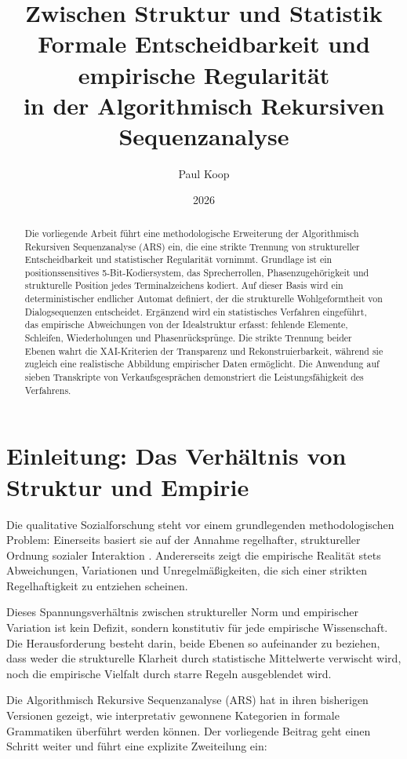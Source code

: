 \documentclass[
  12pt,
  a4paper,
  oneside,
  titlepage
]{article}
\title{\Huge\textbf{Zwischen Struktur und Statistik} \\
       \LARGE Formale Entscheidbarkeit und empirische Regularität \\
       \LARGE in der Algorithmisch Rekursiven Sequenzanalyse}
\author{
  \large
  \begin{tabular}{c}
    Paul Koop
  \end{tabular}
}
\date{\large 2026}
\begin{document}
\maketitle

\begin{abstract}
Die vorliegende Arbeit führt eine methodologische Erweiterung der Algorithmisch 
Rekursiven Sequenzanalyse (ARS) ein, die eine strikte Trennung von struktureller 
Entscheidbarkeit und statistischer Regularität vornimmt. Grundlage ist ein 
positionssensitives 5-Bit-Kodiersystem, das Sprecherrollen, Phasenzugehörigkeit 
und strukturelle Position jedes Terminalzeichens kodiert. Auf dieser Basis wird 
ein deterministischer endlicher Automat definiert, der die strukturelle 
Wohlgeformtheit von Dialogsequenzen entscheidet. Ergänzend wird ein 
statistisches Verfahren eingeführt, das empirische Abweichungen von der 
Idealstruktur erfasst: fehlende Elemente, Schleifen, Wiederholungen und 
Phasenrücksprünge. Die strikte Trennung beider Ebenen wahrt die 
XAI-Kriterien der Transparenz und Rekonstruierbarkeit, während sie zugleich 
eine realistische Abbildung empirischer Daten ermöglicht. Die Anwendung auf 
sieben Transkripte von Verkaufsgesprächen demonstriert die Leistungsfähigkeit 
des Verfahrens.
\end{abstract}

\newpage
\tableofcontents
\newpage

\section{Einleitung: Das Verhältnis von Struktur und Empirie}

Die qualitative Sozialforschung steht vor einem grundlegenden methodologischen 
Problem: Einerseits basiert sie auf der Annahme regelhafter, struktureller 
Ordnung sozialer Interaktion \citep{Oevermann1979, Sacks1974}. Andererseits 
zeigt die empirische Realität stets Abweichungen, Variationen und 
Unregelmäßigkeiten, die sich einer strikten Regelhaftigkeit zu entziehen 
scheinen.

Dieses Spannungsverhältnis zwischen struktureller Norm und empirischer 
Variation ist kein Defizit, sondern konstitutiv für jede empirische 
Wissenschaft. Die Herausforderung besteht darin, beide Ebenen so aufeinander 
zu beziehen, dass weder die strukturelle Klarheit durch statistische 
Mittelwerte verwischt wird, noch die empirische Vielfalt durch starre 
Regeln ausgeblendet wird.

Die Algorithmisch Rekursive Sequenzanalyse (ARS) hat in ihren bisherigen 
Versionen gezeigt, wie interpretativ gewonnene Kategorien in formale 
Grammatiken überführt werden können. Der vorliegende Beitrag geht einen 
Schritt weiter und führt eine explizite Zweiteilung ein:
\end{document}
